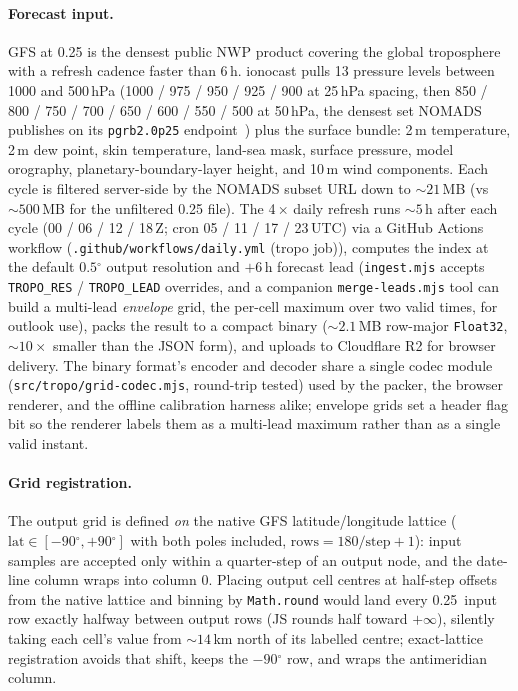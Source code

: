 \documentclass[11pt,a4paper]{article}
\newcommand{\degree}{\ensuremath{{}^\circ}}
\begin{document}
\paragraph{Forecast input.} GFS at 0.25\textdegree{} is the densest
public NWP product covering the global troposphere with a refresh
cadence faster than 6\,h.  ionocast pulls 13 pressure levels
between 1000 and 500\,hPa
(1000 / 975 / 950 / 925 / 900 at 25\,hPa spacing, then
850 / 800 / 750 / 700 / 650 / 600 / 550 / 500 at 50\,hPa, the
densest set NOMADS publishes on its \texttt{pgrb2.0p25}
endpoint~\cite{noaagfs}) plus the surface bundle: 2\,m
temperature, 2\,m dew point, skin temperature, land-sea mask,
surface pressure, model orography, planetary-boundary-layer height,
and 10\,m wind components.  Each cycle is filtered server-side by
the NOMADS subset URL down to ${\sim}21$\,MB (vs ${\sim}500$\,MB
for the unfiltered 0.25\textdegree{} file).  The 4\,$\times$ daily
refresh runs ${\sim}5$\,h after each cycle (00 / 06 / 12 / 18\,Z;
cron 05 / 11 / 17 / 23\,UTC)
via a GitHub Actions workflow
(\texttt{.github/workflows/daily.yml} (tropo job)), computes the index
at the default $0.5\degree$ output resolution and $+6$\,h forecast
lead (\texttt{ingest.mjs} accepts \texttt{TROPO\_RES} /
\texttt{TROPO\_LEAD} overrides, and a companion
\texttt{merge-leads.mjs} tool can build a multi-lead
\emph{envelope} grid, the per-cell maximum over two valid
times, for outlook use), packs the result to a compact binary
(${\sim}2.1$\,MB row-major \texttt{Float32}, ${\sim}10\times$
smaller than the JSON form), and uploads to Cloudflare R2 for
browser delivery.  The binary format's encoder and decoder share a
single codec module (\texttt{src/tropo/grid-codec.mjs}, round-trip
tested) used by the packer, the browser renderer, and the offline
calibration harness alike; envelope grids set a header flag bit so
the renderer labels them as a multi-lead maximum rather than as a
single valid instant.

\paragraph{Grid registration.}  The output grid is defined
\emph{on} the native GFS latitude/longitude lattice
($\text{lat} \in [-90\degree, +90\degree]$ with both poles
included, $\text{rows} = 180/\text{step} + 1$): input samples are
accepted only within a quarter-step of an output node, and the
date-line column wraps into column 0.  Placing
output cell centres at half-step offsets from the native lattice
and binning by \texttt{Math.round} would land every
0.25\,\textdegree{} input row exactly halfway between output rows
(JS rounds half toward $+\infty$), silently taking each cell's
value from ${\sim}14$\,km north of its labelled centre;
exact-lattice registration
avoids that shift, keeps the $-90\degree$ row, and wraps the
antimeridian column.
\end{document}
